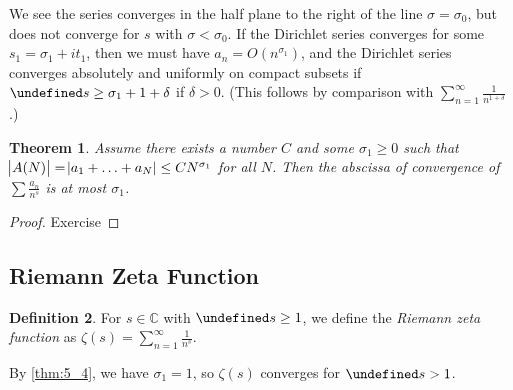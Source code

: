 \documentclass[11pt]{article}
\theoremstyle{definition}
\newtheorem{definition}{Definition}[section]
\theoremstyle{plain}
\newtheorem{theorem}[definition]{Theorem}
\theoremstyle{remark}
\let\Re\undefined
\DeclareMathOperator{\Re}{Re}
\newcommand{\CC}{\mathbb{C}}
\begin{document}
We see the series converges in the half plane to the right of the line $\sigma = \sigma_0$, but does not converge for $s$ with $\sigma < \sigma_0$. If the Dirichlet series converges for some $s_1 = \sigma_1 + i t_1$, then we must have $a_n = O(n^{\sigma_1})$, and the Dirichlet series converges absolutely and uniformly on compact subsets if $\Re s \ge \sigma_1 + 1 + \delta$ if $\delta > 0$. (This follows by comparison with $\sum_{n=1}^{\infty} \frac{1}{n^{1+\delta}}$.)

\begin{theorem}\label{thm:5_4}
    Assume there exists a number $C$ and some $\sigma_1 \ge 0$ such that $\abs{A(N)} = \abs{a_1 + \ldots + a_N} \le C N^{\sigma_1}$ for all $N$. Then the abscissa of convergence of $\sum \frac{a_n}{n^s}$ is at most $\sigma_1$.
\end{theorem}
\begin{proof}
    Exercise
\end{proof}

\subsection{Riemann Zeta Function}

\begin{definition}\label{def:5_5}
    For $s \in \CC$ with $\Re s \ge 1$, we define the \emph{Riemann zeta function} as $\zeta(s) = \sum_{n=1}^\infty \frac{1}{n^s}$.
\end{definition}

\noindent By \autoref{thm:5_4}, we have $\sigma_1 = 1$, so $\zeta(s)$ converges for $\Re s > 1$.
\end{document}
